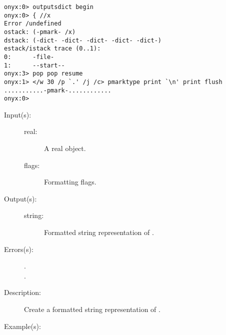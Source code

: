 \begin{description}
\begin{description}
\begin{verbatim}
onyx:0> outputsdict begin
onyx:0> { //x
Error /undefined
ostack: (-pmark- /x)
dstack: (-dict- -dict- -dict- -dict- -dict-)
estack/istack trace (0..1):
0:      -file-
1:      --start--
onyx:3> pop pop resume
onyx:1> </w 30 /p `.' /j /c> pmarktype print `\n' print flush
...........-pmark-............
onyx:0>
		\end{verbatim}
	\end{description}
\label{outputsdict:realtype}
\item[{\onyxop{real flags}{realtype}{string}}: ]
	\begin{description}\item[]
	\item[Input(s): ]
		\begin{description}\item[]
		\item[real: ]
			A real object.
		\item[flags: ]
			Formatting flags.
		\end{description}
	\item[Output(s): ]
		\begin{description}\item[]
		\item[string: ]
			Formatted string representation of .
		\end{description}
	\item[Errors(s): ]
		\begin{description}\item[]
		\item[.]
		\item[.]
		\end{description}
	\item[Description: ]
		Create a formatted string representation of .
	\item[Example(s): ]\begin{verbatim}


\end{verbatim}
\end{description}
\end{description}
